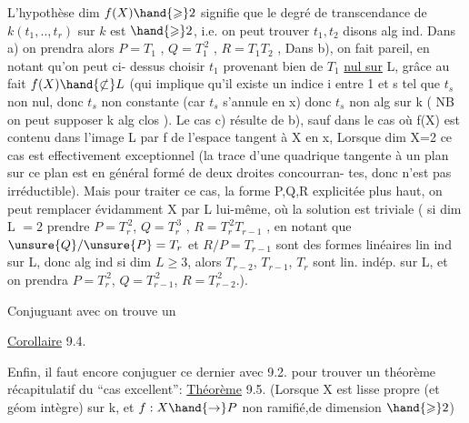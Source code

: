 
L'hypothèse  dim $f(X)\hand{\geqslant} 2$  signifie que  le degré de transcendance de
$k(t_1,..,t_r)$ sur $k$  est $\hand{\geqslant} 2$, i.e. on peut trouver  $t_1,t_2$ disons alg ind.
Dans a) on prendra alors   $P = T_1$ , $Q = T_1^{\,2}$ , $R = T_1T_2$ , Dans b), on
fait pareil,  en notant qu'on peut ci-%
dessus choisir $t_1$ provenant bien de $T_1$ \uline{nul sur} L, grâce au fait $f(X)\hand{\not\subset} L$
(qui implique qu'il  existe un indice  i  entre 1 et s tel que $t_s$ non
nul, donc $t_s$ non constante (car $t_s$ s'annule en x) donc $t_s$  non alg sur k
( NB on peut supposer k alg clos ).  Le cas c) résulte de b),  sauf dans le cas où  f(X) est contenu dans
l'image L par f de l'espace tangent à X en x,  \hand{[}Lorsque dim X=2
ce cas est effectivement exceptionnel (la trace d'une quadrique tangente
à un plan sur ce plan est en général formé de deux droites concourran-%
tes, donc n'est pas irréductible)\hand{]}. Mais pour traiter ce cas,  la
forme P,Q,R explicitée plus haut, on peut remplacer évidamment X par
L lui-même, où la solution est triviale ( si dim L $=2$ prendre $P=T_r^{\,2}$, $Q=T_r^{\,3}$ ,
$R = T_r^{\,2}T_{r-1}$ , en notant que  $\unsure{Q}/\unsure{P} = T_r$ et  $R/P = T_{r-1}$ sont des formes
linéaires lin ind sur L, donc alg ind si dim $L\geqslant 3$, alors $T_{r-2}$, $T_{r-1}$, $T_r$ sont lin. indép. sur L, et on prendra $P=T_r^{\,2}$, $Q=T_{r-1}^{\,2}$, $R=T_{r-2}^{\,2}$.). 

Conjuguant avec  on trouve un

\uline{Corollaire} 9.4.   

Enfin, il faut encore conjuguer  ce dernier avec 9.2. pour
trouver un théorème récapitulatif  du ``cas excellent'':
\uline{Théorème} 9.5.   (Lorsque X est lisse  propre (et géom intègre) sur k, et $f:X\hand{\to} P$ non
ramifié,de dimension $\hand{\geqslant} 2$)

